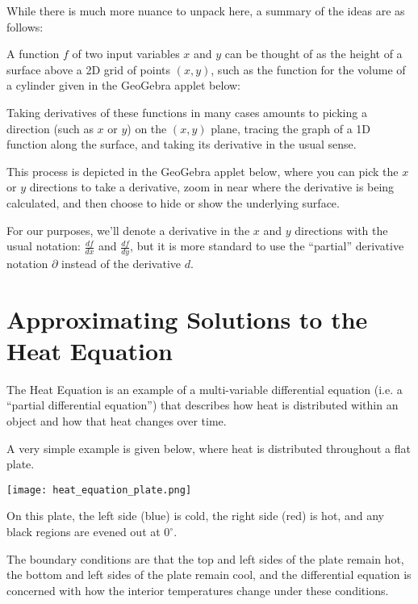 \documentclass{ximera}
\begin{document}
While there is much more nuance to unpack here, a summary of the ideas are as follows:

A function $f$ of two input variables $x$ and $y$ can be thought of as the height of a surface above a 2D grid of points $(x,y)$, such as the function for the volume of a cylinder given in the GeoGebra applet below:

\begin{center}
\end{center}

Taking derivatives of these functions in many cases amounts to picking a direction (such as $x$ or $y$) on the $(x,y)$ plane, tracing the graph of a 1D function along the surface, and taking its derivative in the usual sense. 

This process is depicted in the GeoGebra applet below, where you can pick the $x$ or $y$ directions to take a derivative, zoom in near where the derivative is being calculated, and then choose to hide or show the underlying surface. 

\begin{center}
\end{center}

For our purposes, we'll denote a derivative in the $x$ and $y$ directions with the usual notation: $\frac{df}{dx}$ and $\frac{df}{dy}$, but it is more standard to use the ``partial'' derivative notation $\partial$ instead of the derivative $d$.


\section{Approximating Solutions to the Heat Equation}

The Heat Equation is an example of a multi-variable differential equation (i.e. a ``partial differential equation'') that describes how heat is distributed within an object and how that heat changes over time. 

A very simple example is given below, where heat is distributed throughout a flat plate. 

\begin{center}
    \texttt{[image: heat\_equation\_plate.png]}
\end{center}

On this plate, the left side (blue) is cold, the right side (red) is hot, and any black regions are evened out at $0^\circ$.

The boundary conditions are that the top and left sides of the plate remain hot, the bottom and left sides of the plate remain cool, and the differential equation is concerned with how the interior temperatures change under these conditions.
\end{document}
